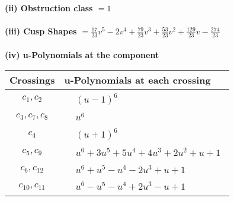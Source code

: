 \documentclass[1p]{elsarticle_modified}
\theoremstyle{definition}
\begin{document}
\flushleft \textbf{(ii) Obstruction class $= 1$}\\~\\
\flushleft \textbf{(iii) Cusp Shapes $= \frac{17}{23} v^5-2 v^4+\frac{79}{23} v^3+\frac{53}{23} v^2+\frac{129}{23} v-\frac{274}{23}$}\\~\\
\newpage\renewcommand{\arraystretch}{1}
\flushleft \textbf{(iv) u-Polynomials at the component}\newline \\
\begin{tabular}{m{50pt}|m{274pt}}
Crossings & \hspace{64pt}u-Polynomials at each crossing \\
\hline $$\begin{aligned}c_{1},c_{2}\end{aligned}$$&$\begin{aligned}
&(u-1)^6
\end{aligned}$\\
\hline $$\begin{aligned}c_{3},c_{7},c_{8}\end{aligned}$$&$\begin{aligned}
&u^6
\end{aligned}$\\
\hline $$\begin{aligned}c_{4}\end{aligned}$$&$\begin{aligned}
&(u+1)^6
\end{aligned}$\\
\hline $$\begin{aligned}c_{5},c_{9}\end{aligned}$$&$\begin{aligned}
&u^6+3 u^5+5 u^4+4 u^3+2 u^2+u+1
\end{aligned}$\\
\hline $$\begin{aligned}c_{6},c_{12}\end{aligned}$$&$\begin{aligned}
&u^6+u^5- u^4-2 u^3+u+1
\end{aligned}$\\
\hline $$\begin{aligned}c_{10},c_{11}\end{aligned}$$&$\begin{aligned}
&u^6- u^5- u^4+2 u^3- u+1
\end{aligned}$\\
\hline
\end{tabular}\\~\\
\end{document}
